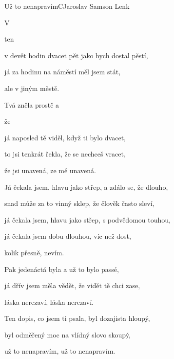 \begin{song}{Už to nenapravím}{C}{Jaroslav Samson Lenk}

\begin{SBChorus}

   

\end{SBChorus}

\begin{SBVerse}

V 

ten 

v devět hodin dvacet pět jako bych dostal pěstí,

já za hodinu na náměstí měl jsem stát,

ale v jiným městě.

Tvá  zněla prostě a 

že 


já naposled tě viděl, když ti bylo dvacet,

to jsi tenkrát řekla, že se nechceš vracet,

že jsi unavená, ze mě unavená.

\end{SBVerse}

\begin{SBVerse}

Já čekala jsem, hlavu jako střep, a zdálo se, že dlouho,

snad může za to vinný sklep, že člověk často sleví,

já čekala jsem, hlavu jako střep, s podvědomou touhou,

já čekala jsem dobu dlouhou, víc než dost, 

kolik přesně, nevím.

Pak jedenáctá byla a už to bylo passé,

já dřív jsem měla vědět, že vidět tě chci zase,

láska nerezaví, láska nerezaví.

Ten dopis, co jsem ti psala, byl dozajista hloupý,

byl odměřený moc na vlídný slovo skoupý,

už to nenapravím, už to nenapravím.

\end{SBVerse}
\end{song}

\pagebreak
